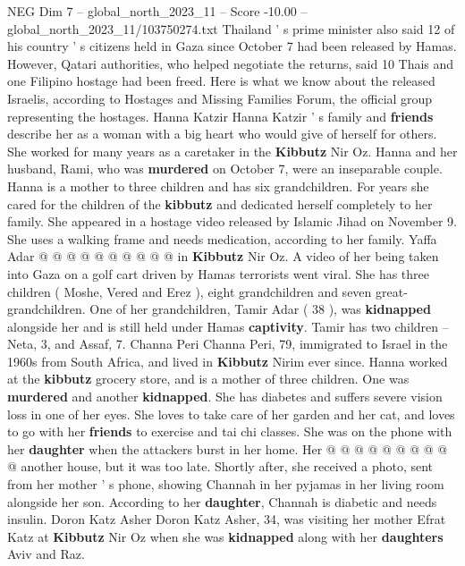 \begin{textsample}{NEG Dim 7 – global\_north\_2023\_11 – Score -10.00 – global\_north\_2023\_11/103750274.txt}  \label{ex:f7_neg_049}
Thailand ' s prime minister also said 12 of his country ' s citizens held in Gaza since October 7 had been released by Hamas.
However, Qatari authorities, who helped negotiate the returns, said 10 Thais and one Filipino hostage had been freed.
Here is what we know about the released Israelis, according to Hostages and Missing Families Forum, the official group representing the hostages.
Hanna Katzir Hanna Katzir ' s family and \textbf{friends} describe her as a woman with a big heart who would give of herself for others.
She worked for many years as a caretaker in the \textbf{Kibbutz} Nir Oz.
Hanna and her husband, Rami, who was \textbf{murdered} on October 7, were an inseparable couple.
Hanna is a mother to three children and has six grandchildren.
For years she cared for the children of the \textbf{kibbutz} and dedicated herself completely to her family.
She appeared in a hostage video released by Islamic Jihad on November 9.
She uses a walking frame and needs medication, according to her family.
Yaffa Adar @ @ @ @ @ @ @ @ @ @ in \textbf{Kibbutz} Nir Oz.
A video of her being taken into Gaza on a golf cart driven by Hamas terrorists went viral.
She has three children ( Moshe, Vered and Erez ), eight grandchildren and seven great-grandchildren.
One of her grandchildren, Tamir Adar ( 38 ), was \textbf{kidnapped} alongside her and is still held under Hamas \textbf{captivity}.
Tamir has two children -- Neta, 3, and Assaf, 7.
Channa Peri Channa Peri, 79, immigrated to Israel in the 1960s from South Africa, and lived in \textbf{Kibbutz} Nirim ever since.
Hanna worked at the \textbf{kibbutz} grocery store, and is a mother of three children.
One was \textbf{murdered} and another \textbf{kidnapped}.
She has diabetes and suffers severe vision loss in one of her eyes.
She loves to take care of her garden and her cat, and loves to go with her \textbf{friends} to exercise and tai chi classes.
She was on the phone with her \textbf{daughter} when the attackers burst in her home.
Her @ @ @ @ @ @ @ @ @ @ another house, but it was too late.
Shortly after, she received a photo, sent from her mother ' s phone, showing Channah in her pyjamas in her living room alongside her son.
According to her \textbf{daughter}, Channah is diabetic and needs insulin.
Doron Katz Asher Doron Katz Asher, 34, was visiting her mother Efrat Katz at \textbf{Kibbutz} Nir Oz when she was \textbf{kidnapped} along with her \textbf{daughters} Aviv and Raz.

\end{textsample}
